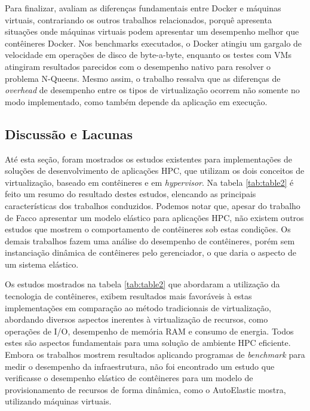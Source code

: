 \documentclass[twoside,english,brazilian]{UNISINOSartigo}
\begin{document}
Para finalizar,  avaliam as diferenças fundamentais entre Docker e máquinas virtuais, contrariando os outros trabalhos relacionados, porquê apresenta situações onde máquinas virtuais podem apresentar um desempenho melhor que contêineres Docker. Nos benchmarks executados, o Docker atingiu um gargalo de velocidade em operações de disco de byte-a-byte, enquanto os testes com VMs atingiram resultados parecidos com o desempenho nativo para resolver o problema N-Queens. Mesmo assim, o trabalho ressalva que as diferenças de \textit{overhead} de desempenho entre os tipos de virtualização ocorrem não somente no modo implementado, como também depende da aplicação em execução. 

\subsection{Discussão e Lacunas}
\label{comparacao}
Até esta seção, foram mostrados os estudos existentes para implementações de soluções de desenvolvimento de aplicações HPC, que utilizam os dois conceitos de virtualização, baseado em contêineres e em \textit{hypervisor}. Na tabela \ref{tab:table2} é feito um resumo do resultado destes estudos, elencando as principais características dos trabalhos conduzidos. Podemos notar que, apesar do trabalho de Facco  apresentar um modelo elástico para aplicações HPC, não existem outros estudos que mostrem o comportamento de contêineres sob estas condições. Os demais trabalhos fazem uma análise do desempenho de contêineres, porém sem instanciação dinâmica de contêineres pelo gerenciador, o que daria o aspecto de um sistema elástico.

Os estudos mostrados na tabela \ref{tab:table2} que abordaram a utilização da tecnologia de contêineres, exibem resultados mais favoráveis à estas implementações em comparação ao método tradicionais de virtualização, abordando diversos aspectos inerentes à virtualização de recursos, como operações de I/O, desempenho de memória RAM e consumo de energia. Todos estes são aspectos fundamentais para uma solução de ambiente HPC eficiente. Embora os trabalhos mostrem resultados aplicando programas de \textit{benchmark} para medir o desempenho da infraestrutura, não foi encontrado um estudo que verificasse o desempenho elástico de contêineres para um modelo de provisionamento de recursos de forma dinâmica, como o AutoElastic mostra, utilizando máquinas virtuais.
\end{document}
